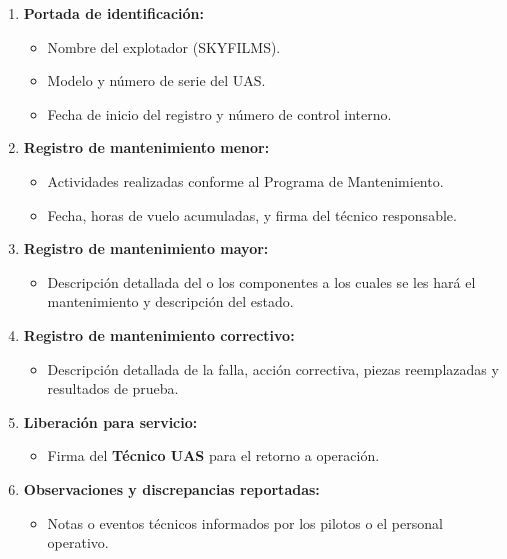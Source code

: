 \begin{enumerate}
    \item \textbf{Portada de identificación:}
        \begin{itemize}
            \item Nombre del explotador (SKYFILMS).

            \item Modelo y número de serie del UAS.

            \item Fecha de inicio del registro y número de control interno.
        \end{itemize}

    \item \textbf{Registro de mantenimiento menor:}
        \begin{itemize}
            \item Actividades realizadas conforme al Programa de Mantenimiento.

            \item Fecha, horas de vuelo acumuladas, y firma del técnico responsable.
        \end{itemize}

    \item \textbf{Registro de mantenimiento mayor:}    
        \begin{itemize}
            \item Descripción detallada del o los componentes a los cuales se les hará el mantenimiento y descripción del estado.
        \end{itemize}

    \item \textbf{Registro de mantenimiento correctivo:}
        \begin{itemize}
            \item Descripción detallada de la falla, acción correctiva, piezas reemplazadas y resultados de prueba.
        \end{itemize}

    \item \textbf{Liberación para servicio:}
        \begin{itemize}
            \item Firma del \textbf{Técnico UAS} para el retorno a operación.
        \end{itemize}


    \item \textbf{Observaciones y discrepancias reportadas:}
        \begin{itemize}
            \item Notas o eventos técnicos informados por los pilotos o el personal operativo.
        \end{itemize}
\end{enumerate}

